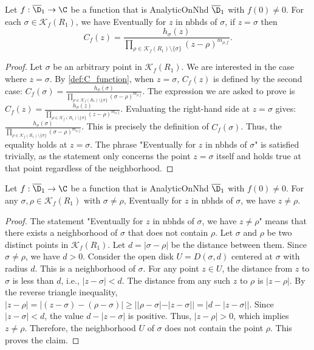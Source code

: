\begin{lemma}[C at zero] \label{lem:C_at_sigma_onK} \leanok {}
Let $f:\overline{\D}_1\to\C$ be a function that is AnalyticOnNhd $\overline{\D}_1$ with $f(0)\neq0$. For each $\sigma \in \mathcal{K}_f(R_1)$, we have Eventually for $z$ in nbhds of $\sigma$, if $z=\sigma$ then
\[C_f(z) = \frac{h_\sigma(z)}{\prod_{\rho\in\mathcal{K}_f(R_1) \setminus\{\sigma\}}(z-\rho)^{m_{\rho,f}}}.\]
\end{lemma}
\begin{proof}
\leanok
Let $\sigma$ be an arbitrary point in $\mathcal{K}_f(R_1)$. We are interested in the case where $z=\sigma$.
By \cref{def:C_function}, when $z = \sigma$, $C_f(z)$ is defined by the second case:
$C_f(\sigma) = \frac{h_\sigma(\sigma)}{\prod_{\rho\in\mathcal{K}_f(R_1) \setminus\{\sigma\}}(\sigma-\rho)^{m_{\rho,f}}}$.
The expression we are asked to prove is $C_f(z) = \frac{h_\sigma(z)}{\prod_{\rho\in\mathcal{K}_f(R_1) \setminus\{\sigma\}}(z-\rho)^{m_{\rho,f}}}$.
Evaluating the right-hand side at $z=\sigma$ gives:
$\frac{h_\sigma(\sigma)}{\prod_{\rho\in\mathcal{K}_f(R_1) \setminus\{\sigma\}}(\sigma-\rho)^{m_{\rho,f}}}$.
This is precisely the definition of $C_f(\sigma)$. Thus, the equality holds at $z=\sigma$. The phrase "Eventually for $z$ in nbhds of $\sigma$" is satisfied trivially, as the statement only concerns the point $z=\sigma$ itself and holds true at that point regardless of the neighborhood.
\end{proof}

\begin{lemma}\label{lem:K_isolated} \leanok {}
Let $f:\overline{\D}_1\to\C$ be a function that is AnalyticOnNhd $\overline{\D}_1$ with $f(0)\neq0$. For any $\sigma,\rho \in \mathcal{K}_f(R_1)$ with $\sigma\neq\rho$,
Eventually for $z$ in nbhds of $\sigma$, we have $z\neq\rho$.
\end{lemma}
\begin{proof}
\leanok
The statement "Eventually for $z$ in nbhds of $\sigma$, we have $z\neq\rho$" means that there exists a neighborhood of $\sigma$ that does not contain $\rho$.
Let $\sigma$ and $\rho$ be two distinct points in $\mathcal{K}_f(R_1)$.
Let $d = |\sigma - \rho|$ be the distance between them. Since $\sigma \neq \rho$, we have $d > 0$.
Consider the open disk $U = D(\sigma, d)$ centered at $\sigma$ with radius $d$. This is a neighborhood of $\sigma$.
For any point $z \in U$, the distance from $z$ to $\sigma$ is less than $d$, i.e., $|z - \sigma| < d$.
The distance from any such $z$ to $\rho$ is $|z - \rho|$. By the reverse triangle inequality, $|z - \rho| = |(z - \sigma) - (\rho - \sigma)| \ge ||\rho - \sigma| - |z - \sigma|| = |d - |z - \sigma||$.
Since $|z - \sigma| < d$, the value $d - |z - \sigma|$ is positive. Thus, $|z - \rho| > 0$, which implies $z \neq \rho$.
Therefore, the neighborhood $U$ of $\sigma$ does not contain the point $\rho$. This proves the claim.
\end{proof}

